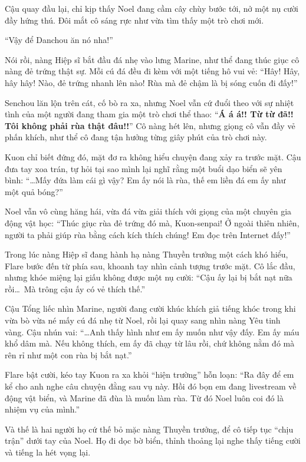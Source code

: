 \documentclass[../main.tex]{subfiles}
\begin{document}
Cậu quay đầu lại, chỉ kịp thấy Noel đang cầm cây chùy bước tới, nở một nụ cười đầy hứng thú. Đôi mắt cô sáng rực như vừa tìm thấy một trò chơi mới.

``Vậy để Danchou ăn nó nha!''

Nói rồi, nàng Hiệp sĩ bắt đầu đá nhẹ vào lưng Marine, như thể đang thúc giục cô nàng đẻ trứng thật sự. Mỗi cú đá đều đi kèm với một tiếng hô vui vẻ: ``Hây! Hây, hây hây! Nào, đẻ trứng nhanh lên nào! Rùa mà đẻ chậm là bị sóng cuốn đi đấy!''

Senchou lăn lộn trên cát, cố bò ra xa, nhưng Noel vẫn cứ đuổi theo với sự nhiệt tình của một người đang tham gia một trò chơi thể thao: ``\textbf{Á á á!! Từ từ đã!! Tôi không phải rùa thật đâu!!}'' Cô nàng hét lên, nhưng giọng cô vẫn đầy vẻ phấn khích, như thể cô đang tận hưởng từng giây phút của trò chơi này.

Kuon chỉ biết đứng đó, mặt đơ ra không hiểu chuyện đang xảy ra trước mặt. Cậu đưa tay xoa trán, tự hỏi tại sao mình lại nghĩ rằng một buổi dạo biển sẽ yên bình: ``\dots Mấy đứa làm cái gì vậy? Em ấy nói là rùa, thế em liền đá em ấy như một quả bóng?''

Noel vẫn vô cùng hăng hái, vừa đá vừa giải thích với giọng của một chuyên gia động vật học: ``Thúc giục rùa đẻ trứng đó mà, Kuon-senpai! Ở ngoài thiên nhiên, người ta phải giúp rùa bằng cách kích thích chúng! Em đọc trên Internet đấy!''

Trong lúc nàng Hiệp sĩ đang hành hạ nàng Thuyền trưởng một cách khó hiểu, Flare bước đến từ phía sau, khoanh tay nhìn cảnh tượng trước mặt. Cô lắc đầu, nhưng khóe miệng lại giấu không được một nụ cười: ``Cậu ấy lại bị bắt nạt nữa rồi\dots\ Mà trông cậu ấy có vẻ thích thế.''


Cậu Tổng liếc nhìn Marine, người đang cười khúc khích giả tiếng khóc trong khi vừa bò vừa né mấy cú đá nhẹ từ Noel, rồi lại quay sang nhìn nàng Yêu tinh vàng. Cậu nhún vai: ``\dots  Anh thấy hình như em ấy muốn như vậy đấy. Em ấy máu khổ dâm mà. Nếu không thích, em ấy đã chạy từ lâu rồi, chứ không nằm đó mà rên rỉ như một con rùa bị bắt nạt.''

Flare bật cười, kéo tay Kuon ra xa khỏi ``hiện trường'' hỗn loạn: ``Ra đây để em kể cho anh nghe câu chuyện đằng sau vụ này. Hồi đó bọn em đang livestream về động vật biển, và Marine đã đùa là muốn làm rùa. Từ đó Noel luôn coi đó là nhiệm vụ của mình.''

Và thế là hai người họ cứ thế bỏ mặc nàng Thuyền trưởng, để cô tiếp tục ``chịu trận'' dưới tay của Noel. Họ đi dọc bờ biển, thỉnh thoảng lại nghe thấy tiếng cười và tiếng la hét vọng lại.
\end{document}
